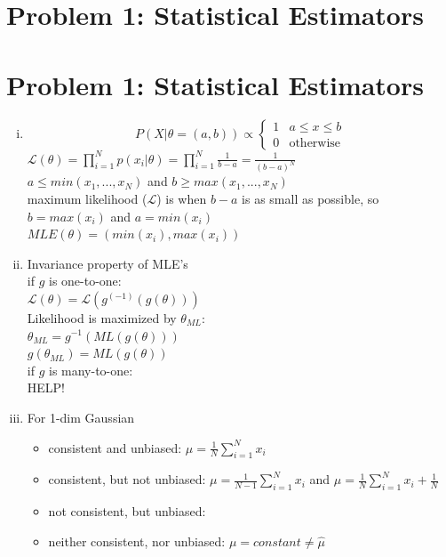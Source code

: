 \documentclass[twoside,11pt]{homework}
\date{\today} %
\begin{document}
\maketitle

\section*{Problem 1: Statistical Estimators}


\section*{Problem 1: Statistical Estimators}
\begin{enumerate}[(i)]
	\item
	\begin{equation*}
	P(X|\theta=(a,b))\propto
	\begin{cases}
	1 & a \leq x \leq b \\
	0 &\text{otherwise}
	\end{cases}
	\end{equation*}
	$\mathcal{L}(\theta)={\displaystyle \prod_{i=1}^{N} p(x_i|\theta)}={\displaystyle \prod_{i=1}^{N} \frac{1}{b-a}=\frac{1}{(b-a)^N}}$ \\[10pt]
	$a\leq min(x_1,...,x_N)$ and $b\geq max(x_1,...,x_N)$ \\[10pt]
	maximum likelihood ($\mathcal{L}$) is when $b-a$ is as small as possible, so $b=max(x_i)$ and $a=min(x_i)$\\[10pt]
	$MLE(\theta)=(min(x_i),max(x_i))$	
	\item Invariance property of MLE's \\
	if $g$ is one-to-one:\\
	$\mathcal{L}(\theta) = \mathcal{L}(g^(-1)(g(\theta)))$\\[10pt]
	Likelihood is maximized by $\theta_{ML}$:\\
	$\theta_{ML}=g^{-1}(ML(g(\theta)))$ \\[10pt]
	$g(\theta_{ML})=ML(g(\theta))$\\[10pt]
	if $g$ is many-to-one:\\
	HELP!
	\item For 1-dim Gaussian
	\begin{itemize}
		\item consistent and unbiased:
		$\mu = \frac{1}{N}{\displaystyle \sum_{i=1}^{N}x_i}$
		\item consistent, but not unbiased:
		$\mu = \frac{1}{N-1}{\displaystyle \sum_{i=1}^{N}x_i}$ and $\mu = \frac{1}{N}{\displaystyle \sum_{i=1}^{N}x_i+\frac{1}{N}}$
		\item not consistent, but unbiased:
		\item neither consistent, nor unbiased:
		$\mu = constant \neq \hat{\mu}$
	\end{itemize}
\end{enumerate}
\end{document}
